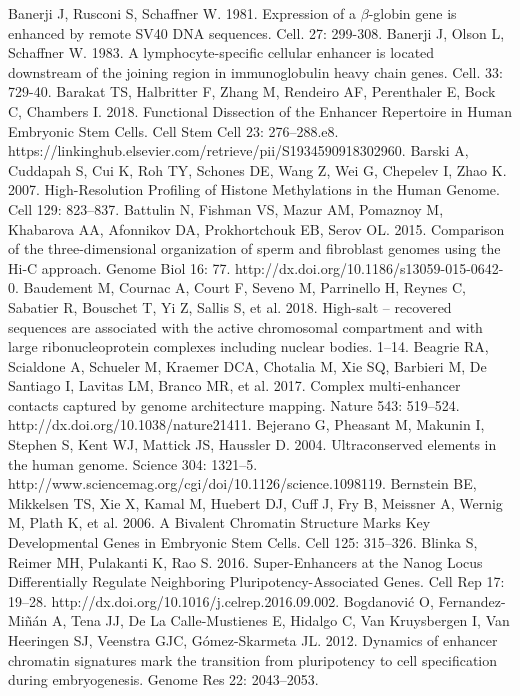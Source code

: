 \begin{thebibliography}{1}
	 Banerji J, Rusconi S, Schaffner W. 1981. Expression of a $\beta$-globin gene is enhanced by remote SV40 DNA sequences. Cell. 27: 299-308.
	 Banerji J, Olson L, Schaffner W. 1983. A lymphocyte-specific cellular enhancer is located downstream of the joining region in immunoglobulin heavy chain genes. Cell. 33: 729-40.
	 Barakat TS, Halbritter F, Zhang M, Rendeiro AF, Perenthaler E, Bock C, Chambers I. 2018. Functional Dissection of the Enhancer Repertoire in Human Embryonic Stem Cells. Cell Stem Cell 23: 276–288.e8. https://linkinghub.elsevier.com/retrieve/pii/S1934590918302960.
	 Barski A, Cuddapah S, Cui K, Roh TY, Schones DE, Wang Z, Wei G, Chepelev I, Zhao K. 2007. High-Resolution Profiling of Histone Methylations in the Human Genome. Cell 129: 823–837.
	 Battulin N, Fishman VS, Mazur AM, Pomaznoy M, Khabarova AA, Afonnikov DA, Prokhortchouk EB, Serov OL. 2015. Comparison of the three-dimensional organization of sperm and fibroblast genomes using the Hi-C approach. Genome Biol 16: 77. http://dx.doi.org/10.1186/s13059-015-0642-0.
	 Baudement M, Cournac A, Court F, Seveno M, Parrinello H, Reynes C, Sabatier R, Bouschet T, Yi Z, Sallis S, et al. 2018. High-salt – recovered sequences are associated with the active chromosomal compartment and with large ribonucleoprotein complexes including nuclear bodies. 1–14.
	 Beagrie RA, Scialdone A, Schueler M, Kraemer DCA, Chotalia M, Xie SQ, Barbieri M, De Santiago I, Lavitas LM, Branco MR, et al. 2017. Complex multi-enhancer contacts captured by genome architecture mapping. Nature 543: 519–524. http://dx.doi.org/10.1038/nature21411.
	 Bejerano G, Pheasant M, Makunin I, Stephen S, Kent WJ, Mattick JS, Haussler D. 2004. Ultraconserved elements in the human genome. Science 304: 1321–5. http://www.sciencemag.org/cgi/doi/10.1126/science.1098119.
	 Bernstein BE, Mikkelsen TS, Xie X, Kamal M, Huebert DJ, Cuff J, Fry B, Meissner A, Wernig M, Plath K, et al. 2006. A Bivalent Chromatin Structure Marks Key Developmental Genes in Embryonic Stem Cells. Cell 125: 315–326.
	 Blinka S, Reimer MH, Pulakanti K, Rao S. 2016. Super-Enhancers at the Nanog Locus Differentially Regulate Neighboring Pluripotency-Associated Genes. Cell Rep 17: 19–28. http://dx.doi.org/10.1016/j.celrep.2016.09.002.
	 Bogdanović O, Fernandez-Miñán A, Tena JJ, De La Calle-Mustienes E, Hidalgo C, Van Kruysbergen I, Van Heeringen SJ, Veenstra GJC, Gómez-Skarmeta JL. 2012. Dynamics of enhancer chromatin signatures mark the transition from pluripotency to cell specification during embryogenesis. Genome Res 22: 2043–2053.

\end{thebibliography}
